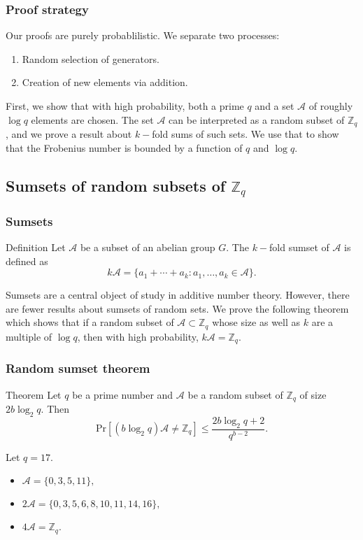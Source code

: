 \documentclass{beamer}
\def\ZZ{\ensuremath{\mathbb{Z}}}
\def\Pr{\ensuremath{\mathrm{Pr}}}
\begin{document}
\begin{frame}
    \frametitle{Proof strategy}
    Our proofs are purely probablilistic. We separate two processes:
    \begin{enumerate}
        \item Random selection of generators.
        \item Creation of new elements via addition.
    \end{enumerate}
    First, we show that with high probability, both a prime $q$ and a set $\mathcal{A}$ of roughly $\log q$ elements are chosen. The set $\mathcal{A}$ can be interpreted as a random subset of $\ZZ_q$, and we prove a result about $k-$fold sums of such sets. We use that to show that the Frobenius number is bounded by a function of $q$ and $\log q$.
\end{frame}


\subsection{Sumsets of random subsets of $\ZZ_q$}

\begin{frame}
    \frametitle{Sumsets}
    \begin{block}{Definition}
        Let $\mathcal{A}$ be a subset of an abelian group $G$. The $k-$fold sumset of $\mathcal{A}$ is defined as
        \[k\mathcal{A} = \{a_1 + \cdots + a_k : a_1, \ldots, a_k \in \mathcal{A}\}.\]
    \end{block}
    Sumsets are a central object of study in additive number theory. However, there are fewer results about sumsets of random sets. We prove the following theorem which shows that if a random subset of $\mathcal{A} \subset \ZZ_q$ whose size as well as $k$ are a multiple of $\log q$, then with high probability, $k\mathcal{A} = \ZZ_q$. 
\end{frame}

\begin{frame}
\frametitle{Random sumset theorem}
\begin{block}{Theorem}
    Let $q$ be a prime number and $\mathcal{A}$ be a random subset of $\mathbb{Z}_q$ of size $2b\log_2 q$. Then
    \[\Pr\left[(b\log_2q)\mathcal{A} \neq \mathbb{Z}_q\right] \leq \frac{2b\log_2 q + 2}{q^{b - 2}}.\]
\end{block}
\begin{example}
    Let \(q = 17\).
    \begin{itemize}
        \item\(\mathcal{A} = \{0, 3, 5, 11\},\)
        \item \(2\mathcal{A} = \{0, 3, 5, 6, 8, 10, 11, 14, 16\},\)
        \item \(4\mathcal{A} = \ZZ_q.\)
    \end{itemize}
\end{example}
\end{frame}
\end{document}
